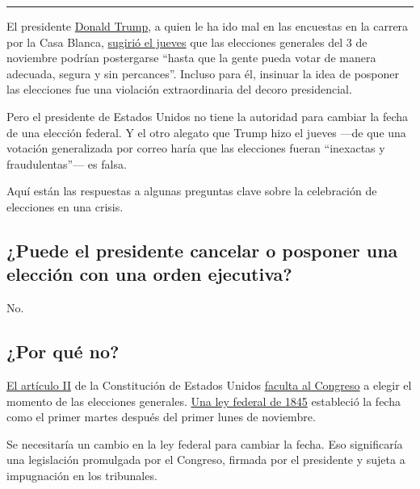 \begin{center}\rule{0.5\linewidth}{\linethickness}\end{center}

El presidente
\href{https://www.nytimes3xbfgragh.onion/es/interactive/2020/espanol/estados-unidos/donald-trump-elecciones.html}{Donald
Trump}, a quien le ha ido mal en las encuestas en la carrera por la Casa
Blanca,
\href{https://www.nytimes3xbfgragh.onion/2020/07/30/us/elections/biden-vs-trump.html}{sugirió
el jueves} que las elecciones generales del 3 de noviembre podrían
postergarse ``hasta que la gente pueda votar de manera adecuada, segura
y sin percances''. Incluso para él, insinuar la idea de posponer las
elecciones fue una violación extraordinaria del decoro presidencial.

Pero el presidente de Estados Unidos no tiene la autoridad para cambiar
la fecha de una elección federal. Y el otro alegato que Trump hizo el
jueves ---de que una votación generalizada por correo haría que las
elecciones fueran ``inexactas y fraudulentas''--- es falsa.

Aquí están las respuestas a algunas preguntas clave sobre la celebración
de elecciones en una crisis.

\hypertarget{puede-el-presidente-cancelar-o-posponer-una-elecciuxf3n-con-una-orden-ejecutiva}{%
\subsection{¿Puede el presidente cancelar o posponer una elección con
una orden
ejecutiva?}\label{puede-el-presidente-cancelar-o-posponer-una-elecciuxf3n-con-una-orden-ejecutiva}}

No.

\hypertarget{por-quuxe9-no}{%
\subsection{¿Por qué no?}\label{por-quuxe9-no}}

\href{https://constitution.congress.gov/browse/essay/artII-S1-C4-1/ALDE_00000230/}{El
artículo II} de la Constitución de Estados Unidos
\href{https://crsreports.congress.gov/product/pdf/R/R46413}{faculta al
Congreso} a elegir el momento de las elecciones generales.
\href{https://www.loc.gov/law/help/statutes-at-large/28th-congress/session-2/c28s2ch1.pdf}{Una
ley federal de 1845} estableció la fecha como el primer martes después
del primer lunes de noviembre.

Se necesitaría un cambio en la ley federal para cambiar la fecha. Eso
significaría una legislación promulgada por el Congreso, firmada por el
presidente y sujeta a impugnación en los tribunales.

